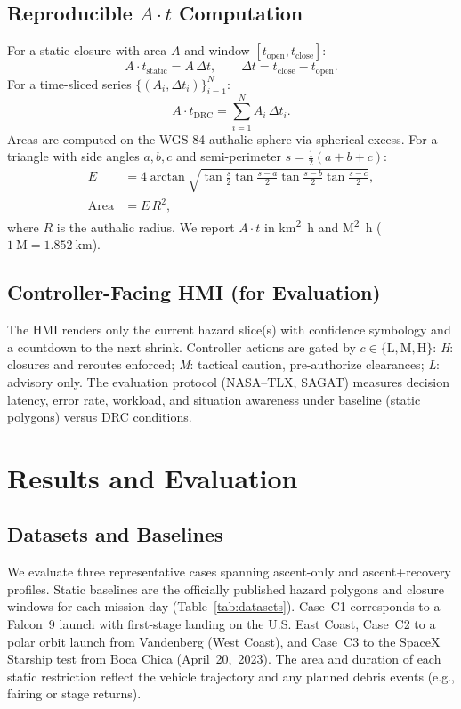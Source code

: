 \documentclass[journal]{new-aiaa}
\newcommand{\At}{\ensuremath{A\cdot t}}
\begin{document}
\subsection{Reproducible \texorpdfstring{\At}{At} Computation}
For a static closure with area $A$ and window $[t_\mathrm{open}, t_\mathrm{close}]$:
\begin{equation}
    \At_\mathrm{static} = A\,\Delta t,\qquad \Delta t = t_\mathrm{close}-t_\mathrm{open}.
\end{equation}
For a time-sliced series $\{(A_i, \Delta t_i)\}_{i=1}^N$:
\begin{equation}
    \At_\mathrm{DRC} = \sum_{i=1}^N A_i\,\Delta t_i.
\end{equation}
Areas are computed on the WGS-84 authalic sphere via spherical excess. For a triangle with side angles $a,b,c$ and semi-perimeter $s=\tfrac{1}{2}(a+b+c)$:
\begin{align}
    E &= 4\arctan\sqrt{\tan\frac{s}{2}\tan\frac{s-a}{2}\tan\frac{s-b}{2}\tan\frac{s-c}{2}},\\
    \mathrm{Area} &= E\,R^2,
\end{align}
where $R$ is the authalic radius. We report \At{} in \si{\kilo\meter\squared\hour} and \si{\nauticalmile\squared\hour} ($1~\si{\nauticalmile}=\SI{1.852}{\kilo\meter}$).

\subsection{Controller-Facing HMI (for Evaluation)}
The HMI renders only the current hazard slice(s) with confidence symbology and a countdown to the next shrink. Controller actions are gated by $c\in\{\text{L},\text{M},\text{H}\}$:
\emph{H}: closures and reroutes enforced;
\emph{M}: tactical caution, pre-authorize clearances;
\emph{L}: advisory only. The evaluation protocol (NASA--TLX, SAGAT) measures decision latency, error rate, workload, and situation awareness under baseline (static polygons) versus DRC conditions.\cite{NASA_TLX,Endsley_SAGAT}

\section{Results and Evaluation}

\subsection{Datasets and Baselines}
We evaluate three representative cases spanning ascent-only and ascent+recovery profiles. Static baselines are the officially published hazard polygons and closure windows for each mission day (Table~\ref{tab:datasets}). Case~C1 corresponds to a Falcon~9 launch with first-stage landing on the U.S. East Coast, Case~C2 to a polar orbit launch from Vandenberg (West Coast), and Case~C3 to the SpaceX Starship test from Boca Chica (April~20,~2023). The area and duration of each static restriction reflect the vehicle trajectory and any planned debris events (e.g., fairing or stage returns).
\end{document}

